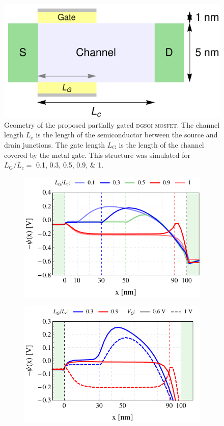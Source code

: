 \documentclass[11pt, a4paper]{article}
\newcommand{\sub}[1]{\ensuremath{_{\mathrm{#1}}}}
\newcommand{\nicefrac}[2]{#1\big/#2}
\newcommand{\mosfet}{\textsc{{mosfet}}}
\newcommand{\LGoverLc}{\nicefrac{L\sub{G}}{L\sub{c}}}
\begin{document}
\begin{figure}[t]
    \centering 
    \includegraphics[width=0.25\columnwidth]{pgmos} \caption{Geometry of the proposed
    partially gated \textsc{dgsoi} \mosfet{}. %
    The channel length $L\sub{c}$ is the length of the semiconductor between the source and drain
    junctions. The gate length $L\sub{G}$ is the length of the channel covered by the metal gate.
    This structure was simulated for $\LGoverLc=$ \numlist{0.1;0.3;0.5;0.9;1}.}
\label{fig:1:1}
\end{figure}%

\begin{figure}[b]
\centering
	\begin{subfigure}{0.245\linewidth}
		\centering
		\includegraphics[width=1\linewidth]{potxPG100}
		\caption{}\label{fig:3:2a}
	\end{subfigure}
	\begin{subfigure}{0.245\linewidth}
		\centering
		\includegraphics[width=1\linewidth]{potxPG100vg0610}

\end{subfigure}
\end{figure}
\end{document}
